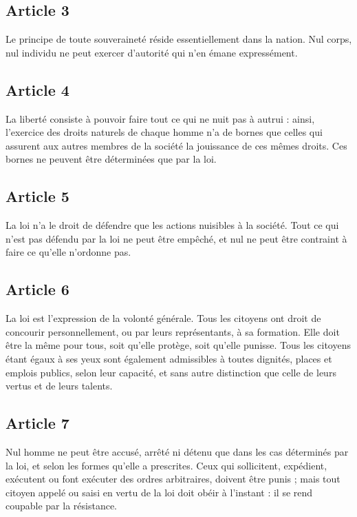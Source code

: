 \documentclass[11pt,a4paper]{article}
\begin{document}
\subsection*{Article 3}

Le principe de toute souveraineté réside essentiellement dans la nation.
Nul corps, nul individu ne peut exercer d'autorité qui n'en émane expressément.

\subsection*{Article 4}

La liberté consiste à pouvoir faire tout ce qui ne nuit pas à autrui : ainsi, l'exercice des droits naturels de chaque homme n'a de bornes que celles qui assurent aux autres membres de la société la jouissance de ces mêmes droits.
Ces bornes ne peuvent être déterminées que par la loi.

\subsection*{Article 5}

La loi n'a le droit de défendre que les actions nuisibles à la société.
Tout ce qui n'est pas défendu par la loi ne peut être empêché, et nul ne peut être contraint à faire ce qu'elle n'ordonne pas.

\subsection*{Article 6}

La loi est l'expression de la volonté générale.
Tous les citoyens ont droit de concourir personnellement, ou par leurs représentants, à sa formation.
Elle doit être la même pour tous, soit qu'elle protège, soit qu'elle punisse.
Tous les citoyens étant égaux à ses yeux sont également admissibles à toutes dignités, places et emplois publics, selon leur capacité, et sans autre distinction que celle de leurs vertus et de leurs talents.

\subsection*{Article 7}

Nul homme ne peut être accusé, arrêté ni détenu que dans les cas déterminés par la loi, et selon les formes qu'elle a prescrites.
Ceux qui sollicitent, expédient, exécutent ou font exécuter des ordres arbitraires, doivent être punis ; mais tout citoyen appelé ou saisi en vertu de la loi doit obéir à l'instant : il se rend coupable par la résistance.
\end{document}
